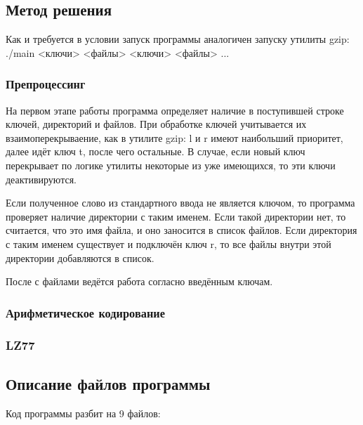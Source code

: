 \documentclass[12pt]{article}
\begin{document}
\subsection*{Метод решения}

Как и требуется в условии запуск программы аналогичен запуску утилиты gzip: ./main <ключи> <файлы> <ключи> <файлы> ...

\subsubsection*{Препроцессинг}

На первом этапе работы программа определяет наличие в поступившей строке ключей, директорий и файлов.
При обработке ключей учитывается их взаимоперекрываение, как в утилите gzip: l и r имеют наибольший приоритет, далее идёт ключ t, после чего остальные. В случае, если новый ключ перекрывает по логике утилиты некоторые из уже имеющихся, то эти ключи деактивируются.

Если полученное слово из стандартного ввода не является ключом, то программа проверяет наличие директории с таким именем. Если такой директории нет, то считается, что это имя файла, и оно заносится в список файлов. Если директория с таким именем существует и подключён ключ r, то все файлы внутри этой директории добавляются в список.

После с файлами ведётся работа согласно введённым ключам.

\subsubsection*{Арифметическое кодирование}%


\subsubsection*{LZ77}%



\subsection*{Описание файлов программы}

Код программы разбит на 9 файлов:
\end{document}

